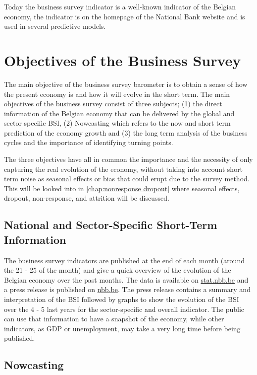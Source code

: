 \documentclass[12pt,a4paper,oneside]{book}
\begin{document}
Today the business survey indicator is a well-known indicator of the Belgian economy, the indicator is on the homepage of the National Bank website and is used in several predictive models.



\section{Objectives of the Business Survey}
\label{section:Objective}

The main objective of the business survey barometer is to obtain a sense of how the present economy is and how it will evolve in the short term.
The main objectives of the business survey consist of three subjects; (1) the direct information of the Belgian economy that can be delivered by the global and sector specific BSI, (2) Nowcasting which refers to the now and short term prediction of the economy growth and (3) the long term analysis of the business cycles and the importance of identifying turning points.

The three objectives have all in common the importance and the necessity of only capturing the real evolution of the economy, without taking into account short term noise as seasonal effects or bias that could erupt due to the survey method.
This will be looked into in \autoref{chap:nonresponse dropout} where seasonal effects, dropout, non-response, and attrition will be discussed.


\subsection{National and Sector-Specific Short-Term Information}

The business survey indicators are published at the end of each month (around the 21 - 25 of the month) and give a quick overview of the evolution of the Belgian economy over the past months.
The data is available on \href{http://stat.nbb.be/Index.aspx?DataSetCode=BUSSURVM&Lang=en}{stat.nbb.be} and a press release is published on \href{http://www.nbb.be/doc/dq/e/conj.htm}{nbb.be}. 
The press release contains a summary and interpretation of the BSI followed by graphs to show the evolution of the BSI over the 4 - 5 last years for the sector-specific and overall indicator.
The public can use that information to have a snapshot of the economy, while other indicators, as GDP or unemployment, may take a very long time before being published.


\subsection{Nowcasting}
\label{sec:nowcasting}
\end{document}
